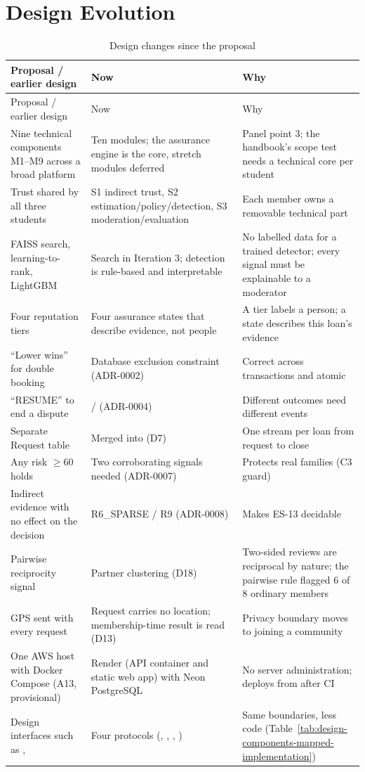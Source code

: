 \section{Design Evolution}\label{sec:design-evolution}
\begingroup
\begin{longtable}{@{}L{111pt}L{111pt}L{153pt}@{}}
\caption{Design changes since the proposal}\label{tab:design-changes-since-proposal}\\
\toprule
Proposal / earlier design & Now & Why \\
\midrule
\endfirsthead
\toprule
Proposal / earlier design & Now & Why \\
\midrule
\endhead
\bottomrule
\endlastfoot
Nine technical components M1--M9 across a broad platform & Ten modules; the assurance engine is the core, stretch modules deferred & Panel point 3; the handbook's scope test needs a technical core per student \\
Trust shared by all three students & S1 indirect trust, S2 estimation/policy/detection, S3 moderation/evaluation & Each member owns a removable technical part \\
FAISS search, learning-to-rank, LightGBM & Search in Iteration 3; detection is rule-based and interpretable & No labelled data for a trained detector; every signal must be explainable to a moderator \\
Four reputation tiers & Four assurance states that describe evidence, not people & A tier labels a person; a state describes this loan's evidence \\
``Lower  wins'' for double booking & Database exclusion constraint (ADR-0002) & Correct across transactions and atomic \\
``RESUME'' to end a dispute &  /  (ADR-0004) & Different outcomes need different events \\
Separate Request table & Merged into  (D7) & One stream per loan from request to close \\
Any risk $\geq$60 holds & Two corroborating signals needed (ADR-0007) & Protects real families (C3 guard) \\
Indirect evidence with no effect on the decision & R6\_SPARSE / R9 (ADR-0008) & Makes ES-13 decidable \\
Pairwise reciprocity signal & Partner clustering (D18) & Two-sided reviews are reciprocal by nature; the pairwise rule flagged 6 of 8 ordinary members \\
GPS sent with every request & Request carries no location; membership-time result is read (D13) & Privacy boundary moves to joining a community \\
One AWS host with Docker Compose (A13, provisional) & Render (API container and static web app) with Neon PostgreSQL & No server administration; deploys from  after CI \\
Design interfaces such as ,  & Four protocols (, , , ) & Same boundaries, less code (Table~\ref{tab:design-components-mapped-implementation}) \\
\end{longtable}
\endgroup
